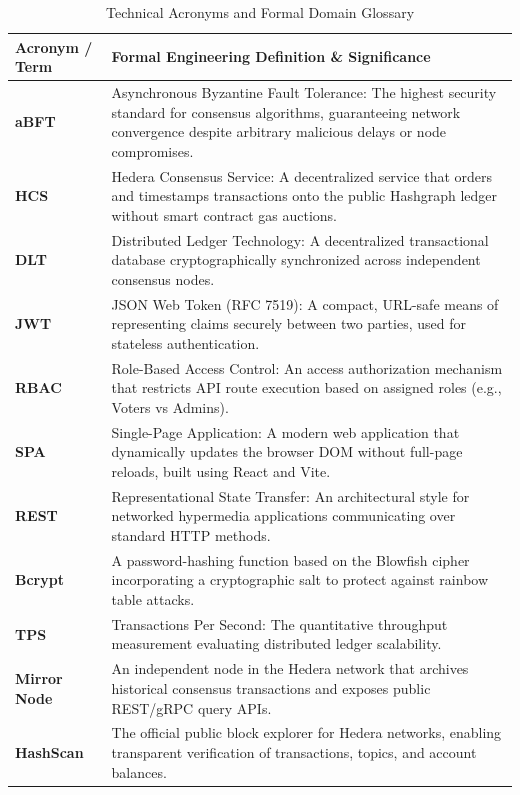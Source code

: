 \documentclass[12pt, a4paper]{article}
\begin{document}
\begin{table}[H]
    \centering
    \caption{Technical Acronyms and Formal Domain Glossary}
    \label{tab:glossary}
    \begin{tabularx}{\textwidth}{@{}l X@{}}
        \toprule
        \textbf{Acronym / Term} & \textbf{Formal Engineering Definition \& Significance} \\
        \midrule
        \textbf{aBFT} & Asynchronous Byzantine Fault Tolerance: The highest security standard for consensus algorithms, guaranteeing network convergence despite arbitrary malicious delays or node compromises. \\
        \textbf{HCS} & Hedera Consensus Service: A decentralized service that orders and timestamps transactions onto the public Hashgraph ledger without smart contract gas auctions. \\
        \textbf{DLT} & Distributed Ledger Technology: A decentralized transactional database cryptographically synchronized across independent consensus nodes. \\
        \textbf{JWT} & JSON Web Token (RFC 7519): A compact, URL-safe means of representing claims securely between two parties, used for stateless authentication. \\
        \textbf{RBAC} & Role-Based Access Control: An access authorization mechanism that restricts API route execution based on assigned roles (e.g., Voters vs Admins). \\
        \textbf{SPA} & Single-Page Application: A modern web application that dynamically updates the browser DOM without full-page reloads, built using React and Vite. \\
        \textbf{REST} & Representational State Transfer: An architectural style for networked hypermedia applications communicating over standard HTTP methods. \\
        \textbf{Bcrypt} & A password-hashing function based on the Blowfish cipher incorporating a cryptographic salt to protect against rainbow table attacks. \\
        \textbf{TPS} & Transactions Per Second: The quantitative throughput measurement evaluating distributed ledger scalability. \\
        \textbf{Mirror Node} & An independent node in the Hedera network that archives historical consensus transactions and exposes public REST/gRPC query APIs. \\
        \textbf{HashScan} & The official public block explorer for Hedera networks, enabling transparent verification of transactions, topics, and account balances. \\
        \bottomrule
    \end{tabularx}
\end{table}
\end{document}
